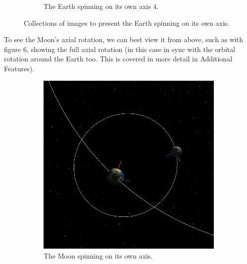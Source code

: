 \documentclass[12pt]{article}
\begin{document}
\begin{figure}[H]
\begin{subfigure}[b]{0.4\textwidth}
                \caption{The Earth spinning on its own axis 4.}
                \label{fig: The axial spin of the Earth 4.}
       \end{subfigure}
       \caption{Collections of images to present the Earth spinning on its own axis.}\label{fig: The Earth's individual rotation.}
\end{figure}

To see the Moon's axial rotation, we can best view it from above, such as with figure 6, showing the full axial rotation (in this case in sync with the orbital rotation around the Earth too. This is covered in more detail in Additional Features).

\begin{figure}[H]
        \centering
        \begin{subfigure}[b]{0.4\textwidth}
                \includegraphics[width=\textwidth]{images/earthandmoonaxisspinabove1}
                \caption{The Moon spinning on its own axis.}
                \label{fig: The axial spin of the Moon.}
       \end{subfigure}
        \begin{subfigure}[b]{0.4\textwidth}

\end{subfigure}
\end{figure}
\end{document}
